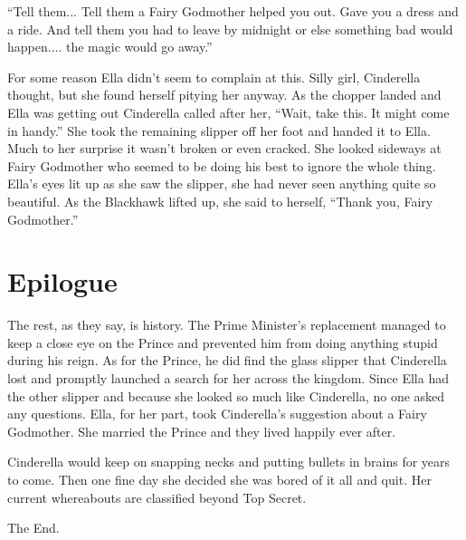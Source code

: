 \documentclass[11pt,letterpaper]{article}
\begin{document}
``Tell them... Tell them a Fairy Godmother helped you out. Gave you a dress and a ride. And tell them you had to leave by midnight or else something bad would happen.... the magic would go away.''

For some reason Ella didn't seem to complain at this. Silly girl, Cinderella thought, but she found herself pitying her anyway. As the chopper landed and Ella was getting out Cinderella called after her, ``Wait, take this. It might come in handy.'' She took the remaining slipper off her foot and handed it to Ella. Much to her surprise it wasn't broken or even cracked. She looked sideways at Fairy Godmother who seemed to be doing his best to ignore the whole thing. Ella's eyes lit up as she saw the slipper, she had never seen anything quite so beautiful. As the Blackhawk lifted up, she said to herself, ``Thank you, Fairy Godmother.''

\section*{Epilogue}
The rest, as they say, is history. The Prime Minister's replacement managed to keep a close eye on the Prince and prevented him from doing anything stupid during his reign. As for the Prince, he did find the glass slipper that Cinderella lost and promptly launched a search for her across the kingdom. Since Ella had the other slipper and because she looked so much like Cinderella, no one asked any questions. Ella, for her part, took Cinderella's suggestion about a Fairy Godmother. She married the Prince and they lived happily ever after. 

Cinderella would keep on snapping necks and putting bullets in brains for years to come.  Then one fine day she decided she was bored of it all and quit. Her current whereabouts are classified beyond Top Secret.

The End.
\end{document}
